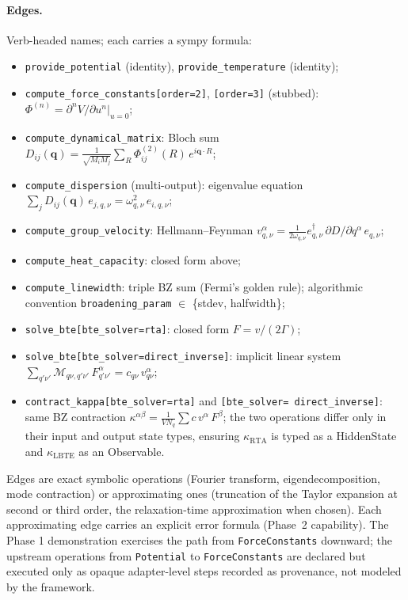 \documentclass[11pt,a4paper]{article}
\begin{document}
\paragraph{Edges.} Verb-headed names; each carries a sympy formula:
\begin{itemize}[leftmargin=2em, itemsep=0.2em]
  \item \texttt{provide\_potential} (identity), \texttt{provide\_temperature} (identity);
  \item \texttt{compute\_force\_constants[order=2]}, \texttt{[order=3]} (stubbed):
        $\Phi^{(n)} = \partial^n V / \partial u^n |_{u=0}$;
  \item \texttt{compute\_dynamical\_matrix}: Bloch sum
        $D_{ij}(\mathbf{q}) = \frac{1}{\sqrt{M_i M_j}}\sum_R \Phi^{(2)}_{ij}(R)\,
        e^{i\mathbf{q}\cdot R}$;
  \item \texttt{compute\_dispersion} (multi-output): eigenvalue equation
        $\sum_j D_{ij}(\mathbf{q})\, e_{j,q,\nu} = \omega^2_{q,\nu}\, e_{i,q,\nu}$;
  \item \texttt{compute\_group\_velocity}: Hellmann--Feynman
        $v^\alpha_{q,\nu} = \frac{1}{2\omega_{q,\nu}} e^\dagger_{q,\nu}\,
        \partial D / \partial q^\alpha\, e_{q,\nu}$;
  \item \texttt{compute\_heat\_capacity}: closed form above;
  \item \texttt{compute\_linewidth}: triple BZ sum (Fermi's golden rule); algorithmic
        convention \texttt{broadening\_param} $\in$ \{stdev, halfwidth\};
  \item \texttt{solve\_bte[bte\_solver=rta]}: closed form $F = v/(2\Gamma)$;
  \item \texttt{solve\_bte[bte\_solver=direct\_inverse]}: implicit linear system
        $\sum_{q'\nu'} \mathcal{M}_{q\nu,q'\nu'}\, F^\alpha_{q'\nu'} = c_{q\nu}\,
        v^\alpha_{q\nu}$;
  \item \texttt{contract\_kappa[bte\_solver=rta]} and \texttt{[bte\_solver=
        direct\_inverse]}: same BZ contraction
        $\kappa^{\alpha\beta} = \frac{1}{V N_q}\sum c\, v^\alpha\, F^\beta$;
        the two operations differ only in their input and output state types,
        ensuring $\kappa_\text{RTA}$ is typed as a HiddenState and $\kappa_\text{LBTE}$
        as an Observable.
\end{itemize}

Edges are exact symbolic operations (Fourier transform, eigendecomposition, mode
contraction) or approximating ones (truncation of the Taylor expansion at second or
third order, the relaxation-time approximation when chosen). Each approximating edge
carries an explicit error formula (Phase~2 capability). The Phase 1 demonstration
exercises the path from \texttt{ForceConstants} downward; the upstream operations from
\texttt{Potential} to \texttt{ForceConstants} are declared but executed only as opaque
adapter-level steps recorded as provenance, not modeled by the framework.
\end{document}
